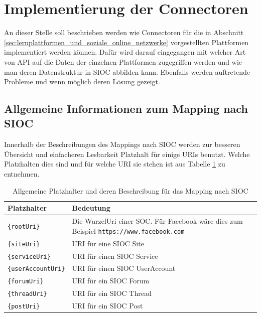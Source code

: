 
\section{Implementierung der Connectoren} %
\label{sec:implementierung_der_connectoren}

An dieser Stelle soll beschrieben werden wie Connectoren für die in Abschnitt \ref{sec:lernplattformen_und_soziale_online_netzwerke} vorgestellten Plattformen implementiert werden können. Dafür wird darauf eingegangen mit welcher Art von API auf die Daten der einzelnen Plattformen zugegriffen werden und wie man deren Datenstruktur in SIOC abbilden kann. Ebenfalls werden auftretende Probleme und wenn möglich deren Lösung gezeigt.

\subsection{Allgemeine Informationen zum Mapping nach SIOC} %
\label{sub:allgemeine_informationen_zum_mapping_nach_sioc}

Innerhalb der Beschreibungen des Mappings nach SIOC werden zur besseren Übersicht und einfacheren Lesbarkeit Platzhalt für einige URIs benutzt. Welche Platzhalten dies sind und für welche URI sie stehen ist aus Tabelle \ref{tbl:platzhalter_fuer_sioc_mapping} zu entnehmen.
\begin{table}[ht]
    \centering
    \caption{Allgemeine Platzhalter und deren Beschreibung für das Mapping nach SIOC}
    \begin{tabular}{l|p{11cm}}
        \textbf{Platzhalter} & \textbf{Bedeutung} \\ 
        \hline
        \texttt{\{rootUri\}} & Die WurzelUri einer SOC. Für Facebook wäre dies zum Beispiel \texttt{https://www.facebook.com} \\
        \texttt{\{siteUri\}} & URI für eine SIOC Site \\
        \texttt{\{serviceUri\}} & URI für einen SIOC Service \\
        \texttt{\{userAccountUri\}} & URI für einen SIOC UserAccount \\
        \texttt{\{forumUri\}} & URI für ein SIOC Forum \\
        \texttt{\{threadUri\}} & URI für ein SIOC Thread \\
        \texttt{\{postUri\}} & URI für ein SIOC Post
    \end{tabular}
    \label{tbl:platzhalter_fuer_sioc_mapping}
\end{table}

